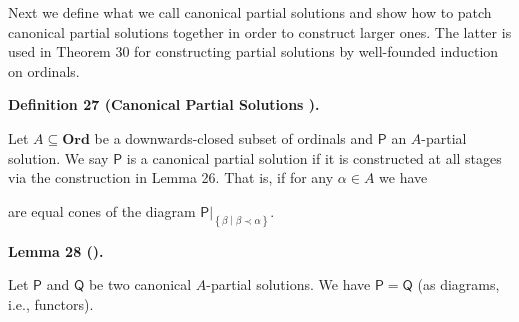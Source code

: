 \documentclass[10pt,a4paper]{article}
\begin{document}
 
Next we define what we call canonical partial solutions and show how to patch canonical partial solutions together in order to construct larger ones. The latter is used in Theorem 30 for constructing partial solutions by well-founded induction on ordinals.\par
 
 
 
\par\medskip\noindent\textbf{Definition 27 (Canonical Partial Solutions ).}\par
 
 
Let $A\subseteq\mathbf{Ord}$ be a downwards-closed subset of ordinals and $\boldsymbol{\mathsf{P}}$ an $A$-partial solution. We say $\boldsymbol{\mathsf{P}}$ is a canonical partial solution if it is constructed at all stages via the construction in Lemma 26. That is, if for any $\alpha\in A$ we have\par
 
\begin{center}\end{center}
 
are equal cones of the diagram ${\left.\boldsymbol{\mathsf{P}}\right|}_{\left\{\beta\middle|\beta\prec\alpha\right\}}$.\par
 
 
 
 
\par\medskip\noindent\textbf{Lemma 28 ().}\par
 
 
Let $\boldsymbol{\mathsf{P}}$ and $\boldsymbol{\mathsf{Q}}$ be two canonical $A$-partial solutions. We have $\boldsymbol{\mathsf{P}}=\boldsymbol{\mathsf{Q}}$ (as diagrams, i.e., functors).\par
 
\end{document}
